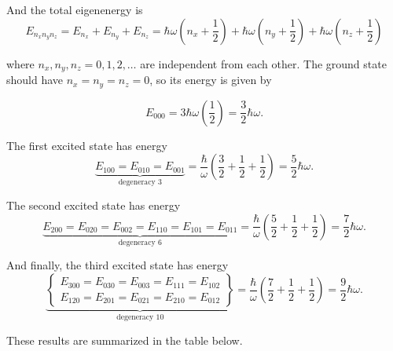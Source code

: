 \documentclass{article}
\numberwithin{equation}{section}
\begin{document}
And the total eigenenergy is
\begin{equation}
    E_{n_x n_y n_z} = E_{n_x} + E_{n_y} + E_{n_z} = \hbar \omega \left( n_x + \frac{1}{2} \right) + \hbar \omega \left( n_y + \frac{1}{2} \right) + \hbar \omega \left( n_z + \frac{1}{2} \right) \label{eqn:3dQHO:eigenenergy}
\end{equation}

where $n_x, n_y, n_z = 0, 1, 2, \dots$ are independent from each other. The ground state should have $n_x = n_y = n_z = 0$, so its energy is given by

\begin{equation*}
    E_{000} = 3 \hbar \omega \left( \frac{1}{2} \right) = \frac{3}{2} \hbar \omega.
\end{equation*}

The first excited state has energy
\begin{equation*}
    \underbrace{E_{100} = E_{010} = E_{001}}_{\text{degeneracy 3}} = \frac{\hbar}{\omega} \left( \frac{3}{2} + \frac{1}{2} + \frac{1}{2} \right) = \frac{5}{2} \hbar \omega.
\end{equation*}

The second excited state has energy
\begin{equation*}
    \underbrace{E_{200} = E_{020} = E_{002} = E_{110} = E_{101} = E_{011}}_{\text{degeneracy 6}} = \frac{\hbar}{\omega} \left( \frac{5}{2} + \frac{1}{2} + \frac{1}{2} \right) = \frac{7}{2} \hbar \omega.
\end{equation*}

And finally, the third excited state has energy
\begin{equation*}
    \underbrace{\left\{ \begin{array}{l} E_{300} = E_{030} = E_{003} = E_{111} = E_{102} \\[0.4em] E_{120} = E_{201} = E_{021} = E_{210} = E_{012} \end{array} \right\}}_{\text{degeneracy 10}} = \frac{\hbar}{\omega} \left( \frac{7}{2} + \frac{1}{2} + \frac{1}{2} \right) = \frac{9}{2} \hbar \omega.
\end{equation*}

These results are summarized in the table below.
\end{document}
